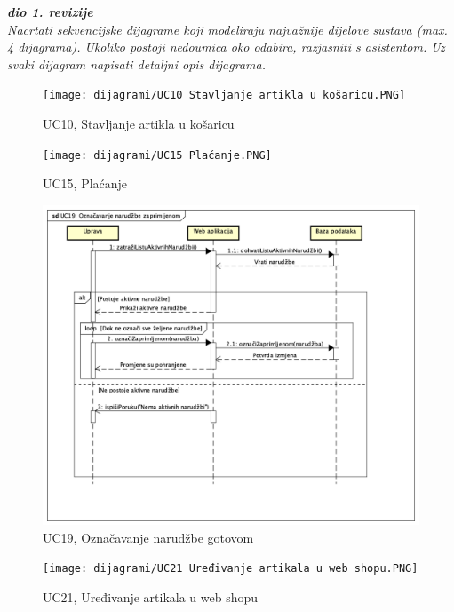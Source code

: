 				\textbf{\textit{dio 1. revizije}}\\
				
				\textit{Nacrtati sekvencijske dijagrame koji modeliraju najvažnije dijelove sustava (max. 4 dijagrama). Ukoliko postoji nedoumica oko odabira, razjasniti s asistentom. Uz svaki dijagram napisati detaljni opis dijagrama.}
				\eject
				
				\begin{figure}[H]
					\texttt{[image: dijagrami/UC10 Stavljanje artikla u košaricu.PNG]}
					\centering
					\caption{UC10, Stavljanje artikla u košaricu}
					\label{fig:SequanceDiagram1}
				\end{figure}
			
				\begin{figure}[H]
					\texttt{[image: dijagrami/UC15 Plaćanje.PNG]}
					\centering
					\caption{UC15, Plaćanje}
					\label{fig:SequanceDiagram2}
				\end{figure}
			
				\begin{figure}[H]
					\includegraphics[scale=0.4]{dijagrami/UC19 Označavanje narudžbe gotovom.PNG}
					\centering
					\caption{UC19, Označavanje narudžbe gotovom}
					\label{fig:SequanceDiagram3}
				\end{figure}
			
				\begin{figure}[H]
					\texttt{[image: dijagrami/UC21 Uređivanje artikala u web shopu.PNG]}
					\centering
					\caption{UC21, Uređivanje artikala u web shopu}
					\label{fig:SequanceDiagram4}
				\end{figure}
	
